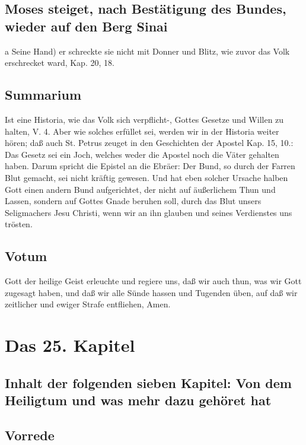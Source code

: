\section[Moses steiget, nach Bestätigung des Bundes, wieder auf]{Moses steiget, nach Bestätigung des Bundes, wieder auf den Berg Sinai}

a Seine Hand) er schreckte sie nicht mit Donner und Blitz, wie zuvor das Volk erschrecket ward, Kap. 20, 18.

\section{Summarium}

Ist eine Historia, wie das Volk sich verpflicht-, Gottes Gesetze und Willen zu halten, V. 4. Aber wie solches erfüllet sei, werden wir in der Historia weiter hören; daß auch St. Petrus zeuget in den Geschichten der Apostel Kap. 15, 10.: Das Gesetz sei ein Joch, welches weder die Apostel noch die Väter gehalten haben. Darum spricht die Epistel an die Ebräer: Der Bund, so durch der Farren Blut gemacht, sei nicht kräftig gewesen. Und hat eben solcher Ursache halben Gott einen andern Bund aufgerichtet, der nicht auf äußerlichem Thun und Lassen, sondern auf Gottes Gnade beruhen soll, durch das Blut unsers Seligmachers Jesu Christi, wenn wir an ihn glauben und seines Verdienstes uns trösten.

\section{Votum}

Gott der heilige Geist erleuchte und regiere uns, daß wir auch thun, was wir Gott zugesagt haben, und daß wir alle Sünde hassen und Tugenden üben, auf daß wir zeitlicher und ewiger Strafe entfliehen, Amen.

\chapter{Das 25. Kapitel}

\section[Inhalt der folgenden sieben Kapitel: Von dem Heiligtum]{Inhalt der folgenden sieben Kapitel: Von dem Heiligtum und was mehr dazu gehöret hat}

\section{Vorrede}

